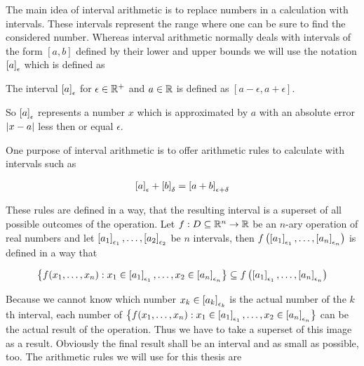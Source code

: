The main idea of interval arithmetic is to replace numbers in a calculation with intervals. These intervals represent the range where one can be sure to find the considered number. Whereas interval arithmetic normally deals with intervals of the form $[a,b]$ defined by their lower and upper bounds  we will use the notation $\an{a}$ which is defined as 

\begin{definition}
  The interval $\an{a}$ for $\epsilon \in \Rplus$ and $a\in \R$ is defined as $[a-\epsilon,a+\epsilon]$.
\end{definition}

So $\an{a}$ represents a number $x$ which is approximated by $a$ with an absolute error $\abs{x-a}$ less then or equal $\epsilon$.

One purpose of interval arithmetic is to offer arithmetic rules to calculate with intervals such as 

\begin{align}
  \an{a}+\an[\delta]{b} = \an[\epsilon+\delta]{a+b}
\end{align}

These rules are defined in a way, that the resulting interval is a superset of all possible outcomes of the operation. Let $f:D\subseteq\R^n\to\R$ be an $n$-ary operation of real numbers and let $\an[\epsilon_1]{a_1},\ldots,\an[\epsilon_2]{a_2}$ be $n$ intervals, then $f\left(\an[\epsilon_1]{a_1},\ldots,\an[\epsilon_n]{a_n}\right)$ is defined in a way that 

\begin{align}
  \left\{f(x_1,\ldots,x_n):x_1\in\an[\epsilon_1]{a_1},\ldots,x_2\in\an[\epsilon_n]{a_n}\right\} \subseteq f\left(\an[\epsilon_1]{a_1},\ldots,\an[\epsilon_n]{a_n}\right)
\end{align}

Because we cannot know which number $x_k \in \an[\epsilon_k]{a_k}$ is the actual number of the $k$th interval, each number of $\left\{f(x_1,\ldots,x_n):x_1\in\an[\epsilon_1]{a_1},\ldots,x_2\in\an[\epsilon_n]{a_n}\right\}$ can be the actual result of the operation. Thus we have to take a superset of this image as a result. Obviously the final result shall be an interval and as small as possible, too. The arithmetic rules we will use for this thesis are 

\begin{theorem}

\end{theorem}

